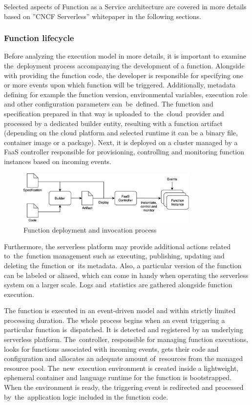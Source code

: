 Selected aspects of Function as a Service architecture are covered in more details based on ''CNCF Serverless'' whitepaper \cite{CNCFServerless} in the following sections.

\subsubsection{Function lifecycle}

Before analyzing the execution model in more details, it is important to examine the~deployment process accompanying the development of a function. Alongside with providing the function code, the developer is responsible for specifying one or more events upon which function will be triggered. Additionally, metadata defining for example the function version, environmental variables, execution role and other configuration parameters can~be~defined. The function and specification prepared in that way is uploaded to~the~cloud~provider and processed by a dedicated builder entity, resulting with a function artifact (depending on the cloud platform and selected runtime it can be a binary file, container image or a package). Next, it is deployed on a cluster managed by a FaaS controller responsible for provisioning, controlling and monitoring function instances based on incoming events.

\begin{figure}[h]
    \centering
    \includegraphics[width=0.8\textwidth]{assets/02-serverless/ServerlessDeployment.png}
    \caption{Function deployment and invocation process}
    \label{fig:function-deployment-and-invocation-process}
\end{figure}

Furthermore, the serverless platform may provide additional actions related to~the~function management such as executing, publishing, updating and deleting the function or~its metadata. Also, a particular version of the function can be labeled or aliased, which can come in handy when operating the serverless system on a larger scale. Logs and~statistics are gathered alongside function execution.

The function is executed in an event-driven model and within strictly limited processing duration. The whole process begins when an event triggering a particular function is~dispatched. It is detected and registered by an underlying serverless platform. The~controller, responsible for managing function executions, looks for functions associated with incoming events, gets their code and configuration and allocates an adequate amount of~resources from the managed resource pool. The~new~execution environment is created inside a lightweight, ephemeral container and language runtime for the function is bootstrapped. When the environment is ready, the triggering event is redirected and processed by~the~application logic included in the function code.

